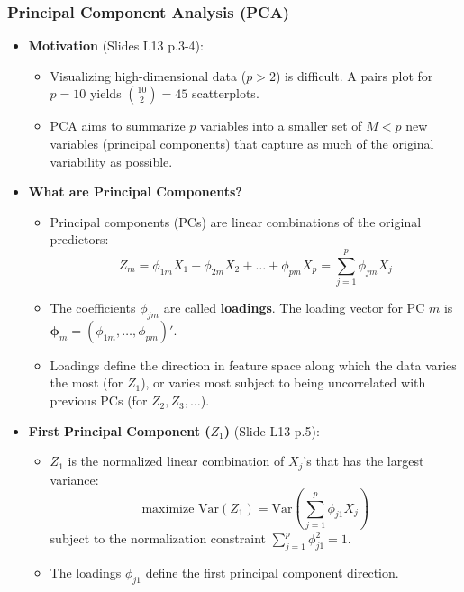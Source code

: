 \documentclass[12pt,a4paper]{article}
\begin{document}
    \subsubsection{Principal Component Analysis (PCA) }
        \begin{itemize}
            \item \textbf{Motivation} (Slides L13 p.3-4):
                \begin{itemize}
                    \item Visualizing high-dimensional data ($p > 2$) is difficult. A pairs plot for $p=10$ yields $\binom{10}{2}=45$ scatterplots.
                    \item PCA aims to summarize $p$ variables into a smaller set of $M < p$ new variables (principal components) that capture as much of the original variability as possible.
                \end{itemize}
            \item \textbf{What are Principal Components?}
                \begin{itemize}
                    \item Principal components (PCs) are linear combinations of the original predictors:
                        $$ Z_m = \phi_{1m}X_1 + \phi_{2m}X_2 + \dots + \phi_{pm}X_p = \sum_{j=1}^p \phi_{jm}X_j $$
                    \item The coefficients $\phi_{jm}$ are called \textbf{loadings}. The loading vector for PC $m$ is $\boldsymbol{\phi}_m = (\phi_{1m}, \dots, \phi_{pm})'$.
                    \item Loadings define the direction in feature space along which the data varies the most (for $Z_1$), or varies most subject to being uncorrelated with previous PCs (for $Z_2, Z_3, \dots$).
                \end{itemize}
            \item \textbf{First Principal Component ($Z_1$)} (Slide L13 p.5):
                \begin{itemize}
                    \item $Z_1$ is the normalized linear combination of $X_j$'s that has the largest variance:
                        $$ \text{maximize } \text{Var}(Z_1) = \text{Var}\left(\sum_{j=1}^p \phi_{j1}X_j\right) $$
                        subject to the normalization constraint $\sum_{j=1}^p \phi_{j1}^2 = 1$.
                    \item The loadings $\phi_{j1}$ define the first principal component direction.
                \end{itemize}

\end{itemize}
\end{document}
